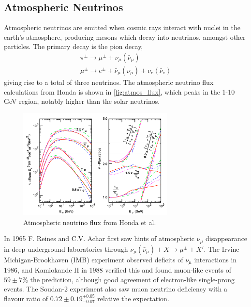 \subsection{Atmospheric Neutrinos}
Atmospheric neutrinos are emitted when cosmic rays interact with nuclei in the earth's atmosphere, producing mesons which decay into neutrinos, amongst other particles. The primary decay is the pion decay,
\begin{gather*}
	\pi^\pm \rightarrow \mu^\pm + \nu_\mu(\bar{\nu}_\mu) \\
	\mu^\pm \rightarrow e^\pm + \bar{\nu}_\mu (\nu_\mu) + \nu_e (\bar{\nu}_e)
\end{gather*}
giving rise to a total of three neutrinos. The atmospheric neutrino flux calculations from Honda\cite{honda_flux} is shown in \autoref{fig:atmos_flux}, which peaks in the 1-10 GeV region, notably higher than the solar neutrinos.
\begin{figure}[h]
	\includegraphics[width=0.7\textwidth, trim={0mm 0mm 0mm 0mm}, clip,page=1]{figures/theory/honda_flux}
	\caption{Atmospheric neutrino flux from Honda et al. \cite{honda_flux}}
	\label{fig:atmos_flux}
\end{figure}

In 1965 F. Reines\cite{reines_atmos} and C.V. Achar\cite{india_atmos_hint} first saw hints of atmospheric $\nu_\mu$ disappearance in deep underground laboratories through $\nu_\mu(\bar{\nu}_\mu) + X \rightarrow \mu^\pm + X'$. The Irvine-Michigan-Brookhaven (IMB) experiment observed deficits of $\nu_\mu$ interactions in 1986\cite{imb}, and Kamiokande II in 1988\cite{kamiokande_atmos_hint} verified this and found muon-like events of $59\pm7\%$ the prediction, although good agreement of electron-like single-prong events. The Soudan-2 experiment\cite{soudan2} also saw muon neutrino deficiency with a flavour ratio of $0.72\pm0.19^{+0.05}_{-0.07}$ relative the expectation. 

